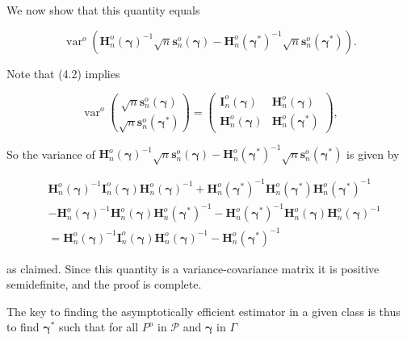 \documentclass[10pt]{article}
\begin{document}
We now show that this quantity equals

$$
\operatorname{var}^{o}\left(\mathbf{H}_{n}^{o}(\boldsymbol{\gamma})^{-1} \sqrt{n} \mathbf{s}_{n}^{o}(\boldsymbol{\gamma})-\mathbf{H}_{n}^{o}\left(\boldsymbol{\gamma}^{*}\right)^{-1} \sqrt{n} \mathbf{s}_{n}^{o}\left(\boldsymbol{\gamma}^{*}\right)\right) .
$$

Note that (4.2) implies

$$
\operatorname{var}^{o}\binom{\sqrt{n} \mathbf{s}_{n}^{o}(\boldsymbol{\gamma})}{\sqrt{n} \mathbf{s}_{n}^{o}\left(\boldsymbol{\gamma}^{*}\right)}=\left(\begin{array}{cc}
\mathbf{I}_{n}^{o}(\boldsymbol{\gamma}) & \mathbf{H}_{n}^{o}(\boldsymbol{\gamma}) \\
\mathbf{H}_{n}^{o}(\boldsymbol{\gamma}) & \mathbf{H}_{n}^{o}\left(\boldsymbol{\gamma}^{*}\right)
\end{array}\right),
$$

So the variance of $\mathbf{H}_{n}^{o}(\boldsymbol{\gamma})^{-1} \sqrt{n} \mathbf{s}_{n}^{o}(\boldsymbol{\gamma})-\mathbf{H}_{n}^{o}\left(\boldsymbol{\gamma}^{*}\right)^{-1} \sqrt{n} \mathbf{s}_{n}^{o}\left(\boldsymbol{\gamma}^{*}\right)$ is given by

$$
\begin{aligned}
& \mathbf{H}_{n}^{o}(\boldsymbol{\gamma})^{-1} \mathbf{I}_{n}^{o}(\boldsymbol{\gamma}) \mathbf{H}_{n}^{o}(\boldsymbol{\gamma})^{-1}+ \mathbf{H}_{n}^{o}\left(\boldsymbol{\gamma}^{*}\right)^{-1} \mathbf{H}_{n}^{o}\left(\boldsymbol{\gamma}^{*}\right) \mathbf{H}_{n}^{o}\left(\boldsymbol{\gamma}^{*}\right)^{-1} \\
&-\mathbf{H}_{n}^{o}(\boldsymbol{\gamma})^{-1} \mathbf{H}_{n}^{o}(\boldsymbol{\gamma}) \mathbf{H}_{n}^{o}\left(\boldsymbol{\gamma}^{*}\right)^{-1}-\mathbf{H}_{n}^{o}\left(\boldsymbol{\gamma}^{*}\right)^{-1} \mathbf{H}_{n}^{o}(\boldsymbol{\gamma}) \mathbf{H}_{n}^{o}(\boldsymbol{\gamma})^{-1} \\
&=\mathbf{H}_{n}^{o}(\boldsymbol{\gamma})^{-1} \mathbf{I}_{n}^{o}(\boldsymbol{\gamma}) \mathbf{H}_{n}^{o}(\boldsymbol{\gamma})^{-1}-\mathbf{H}_{n}^{o}\left(\boldsymbol{\gamma}^{*}\right)^{-1}
\end{aligned}
$$

as claimed. Since this quantity is a variance-covariance matrix it is positive semidefinite, and the proof is complete.

The key to finding the asymptotically efficient estimator in a given class is thus to find $\boldsymbol{\gamma}^{*}$ such that for all $P^{o}$ in $\mathcal{P}$ and $\boldsymbol{\gamma}$ in $\Gamma$
\end{document}
